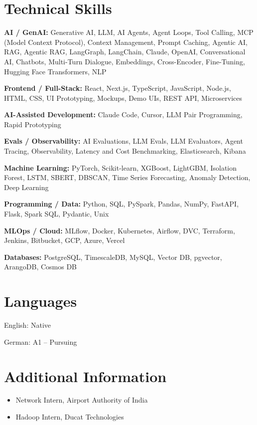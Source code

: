 \documentclass[10pt,a4paper]{article}
\begin{document}
\section{Technical Skills}
\textbf{AI / GenAI:} Generative AI, LLM, AI Agents, Agent Loops, Tool Calling, MCP (Model Context Protocol), Context Management, Prompt Caching, Agentic AI, RAG, Agentic RAG, LangGraph, LangChain, Claude, OpenAI, Conversational AI, Chatbots, Multi-Turn Dialogue, Embeddings, Cross-Encoder, Fine-Tuning, Hugging Face Transformers, NLP\par
\textbf{Frontend / Full-Stack:} React, Next.js, TypeScript, JavaScript, Node.js, HTML, CSS, UI Prototyping, Mockups, Demo UIs, REST API, Microservices\par
\textbf{AI-Assisted Development:} Claude Code, Cursor, LLM Pair Programming, Rapid Prototyping\par
\textbf{Evals / Observability:} AI Evaluations, LLM Evals, LLM Evaluators, Agent Tracing, Observability, Latency and Cost Benchmarking, Elasticsearch, Kibana\par
\textbf{Machine Learning:} PyTorch, Scikit-learn, XGBoost, LightGBM, Isolation Forest, LSTM, SBERT, DBSCAN, Time Series Forecasting, Anomaly Detection, Deep Learning\par
\textbf{Programming / Data:} Python, SQL, PySpark, Pandas, NumPy, FastAPI, Flask, Spark SQL, Pydantic, Unix\par
\textbf{MLOps / Cloud:} MLflow, Docker, Kubernetes, Airflow, DVC, Terraform, Jenkins, Bitbucket, GCP, Azure, Vercel\par
\textbf{Databases:} PostgreSQL, TimescaleDB, MySQL, Vector DB, pgvector, ArangoDB, Cosmos DB\par

\section{Languages}
English: Native\par
German: A1 -- Pursuing\par

\section{Additional Information}
\begin{itemize}
  \item Network Intern, Airport Authority of India
  \item Hadoop Intern, Ducat Technologies
\end{itemize}
\end{document}
